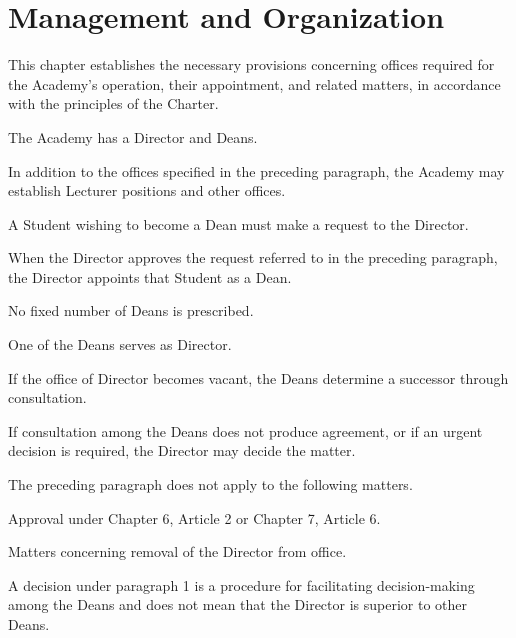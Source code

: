 \newpage
\chapter{Management and Organization}
\begin{articles}
  \item This chapter establishes the necessary provisions concerning offices required for the Academy's operation, their appointment, and related matters, in accordance with the principles of the Charter.
  \item The Academy has a Director and Deans.
  \begin{paragraphs}
    \item In addition to the offices specified in the preceding paragraph, the Academy may establish Lecturer positions and other offices.
  \end{paragraphs}
  \item A Student wishing to become a Dean must make a request to the Director.
  \begin{paragraphs}
    \item When the Director approves the request referred to in the preceding paragraph, the Director appoints that Student as a Dean.
    \item No fixed number of Deans is prescribed.
  \end{paragraphs}
  \item One of the Deans serves as Director.
  \begin{paragraphs}
    \item If the office of Director becomes vacant, the Deans determine a successor through consultation.
  \end{paragraphs}
  \item If consultation among the Deans does not produce agreement, or if an urgent decision is required, the Director may decide the matter.
  \begin{paragraphs}
    \item The preceding paragraph does not apply to the following matters.
    \begin{subitems}
      \item Approval under Chapter 6, Article 2 or Chapter 7, Article 6.
      \item Matters concerning removal of the Director from office.
    \end{subitems}
    \item A decision under paragraph 1 is a procedure for facilitating decision-making among the Deans and does not mean that the Director is superior to other Deans.

\end{paragraphs}
\end{articles}
